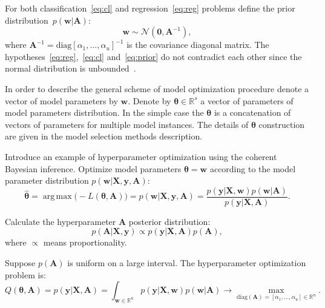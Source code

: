 \documentclass[smallcondensed]{svjour3}
\DeclareMathOperator*{\argmax}{arg\,max}
\begin{document}
For both classification~\eqref{eq:cl} and regression~\eqref{eq:reg} problems define the prior distribution~$p(\mathbf{w}|\mathbf{A})$:
\begin{equation}
\label{eq:prior}
	\mathbf{w} \sim \mathcal{N}(\mathbf{0}, \mathbf{A}^{-1}),
\end{equation}
where  $\mathbf{A}^{-1} = \text{diag}[\alpha_1, \dots, \alpha_u]^{-1}$ is the covariance  diagonal matrix. The hypotheses~\eqref{eq:reg},~\eqref{eq:cl} and~\eqref{eq:prior} 	do	not	contradict	each other since the normal distribution is unbounded~\cite{bayes_constr}.  

In order to describe the general scheme of model optimization procedure denote a vector of model parameters by $\mathbf{w}$. Denote by $\boldsymbol{\theta} \in \mathbb{R}^s$ a vector of parameters of model parameters distribution. In the simple case the $\boldsymbol{\theta}$ is a concatenation of vectors of parameters for multiple model instances. The details of $\boldsymbol{\theta}$ construction are given in the model selection methods description. 

Introduce an example of hyperparameter optimization using the coherent Bayesian inference. Optimize model parameters $\boldsymbol{\theta} = \mathbf{w}$ according to the model parameter distribution $p(\mathbf{w}|\mathbf{X}, \mathbf{y}, \mathbf{A})$:
\begin{equation}
\label{eq:bayes1}
\hat{\boldsymbol{\theta}} = \argmax \bigl(-L(\boldsymbol{\theta}, \mathbf{A})\bigr) = p(\mathbf{w}|\mathbf{X}, \mathbf{y}, \mathbf{A}) = \frac{p(\mathbf{y}|\mathbf{X},\mathbf{w})p(\mathbf{w}|\mathbf{A})}{p(\mathbf{y}|\mathbf{X},\mathbf{A})}.
\end{equation}

Calculate the hyperparameter  $\mathbf{A}$ posterior distribution:
\[
p(\mathbf{A}|\mathbf{X}, \mathbf{y}) \propto p(\mathbf{y}|\mathbf{X},\mathbf{A})p(\mathbf{A}),
\]
where $\propto$ means proportionality.

Suppose $p(\mathbf{A})$ is uniform on a large interval. The hyperparameter optimization problem is:
\begin{equation}
\label{eq:bayes2}
	Q(\boldsymbol{\theta}, \mathbf{A}) = p(\mathbf{y}|\mathbf{X},\mathbf{A}) = \int_{\mathbf{w} \in \mathbb{R}^u} p(\mathbf{y}|\mathbf{X}, \mathbf{w}) p(\mathbf{w}|\mathbf{A}) \to \max_{\text{diag}(\mathbf{A}) = [\alpha_1, \dots, \alpha_u] \in \mathbb{R}^{n}}.
\end{equation}


 
\end{document}
